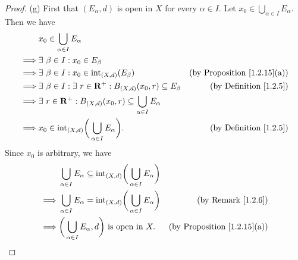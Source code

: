 \begin{proof}{(g)}
    First that \((E_\alpha, d)\) is open in \(X\) for every \(\alpha \in I\).
    Let \(x_0 \in \bigcup_{\alpha \in I} E_\alpha\).
    Then we have
    \begin{align*}
                 & x_0 \in \bigcup_{\alpha \in I} E_\alpha                                                                                              \\
        \implies & \exists\ \beta \in I : x_0 \in E_\beta                                                                                               \\
        \implies & \exists\ \beta \in I : x_0 \in \text{int}_{(X, d)}(E_\beta)                                & \text{(by Proposition \ref{1.2.15}(a))} \\
        \implies & \exists\ \beta \in I : \exists\ r \in \mathbf{R}^+ : B_{(X, d)}(x_0, r) \subseteq E_\beta  & \text{(by Definition \ref{1.2.5})}      \\
        \implies & \exists\ r \in \mathbf{R}^+ : B_{(X, d)}(x_0, r) \subseteq \bigcup_{\alpha \in I} E_\alpha                                           \\
        \implies & x_0 \in \text{int}_{(X, d)}\bigg(\bigcup_{\alpha \in I} E_\alpha\bigg).                    & \text{(by Definition \ref{1.2.5})}
    \end{align*}
    Since \(x_0\) is arbitrary, we have
    \begin{align*}
                 & \bigcup_{\alpha \in I} E_\alpha \subseteq \text{int}_{(X, d)}\bigg(\bigcup_{\alpha \in I} E_\alpha\bigg)                                           \\
        \implies & \bigcup_{\alpha \in I} E_\alpha = \text{int}_{(X, d)}\bigg(\bigcup_{\alpha \in I} E_\alpha\bigg)         & \text{(by Remark \ref{1.2.6})}          \\
        \implies & \bigg(\bigcup_{\alpha \in I} E_\alpha, d\bigg) \text{ is open in } X.                                    & \text{(by Proposition \ref{1.2.15}(a))}
    \end{align*}


\end{proof}
